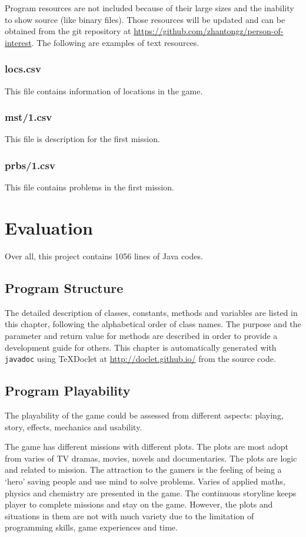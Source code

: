 \documentclass[letterpaper, 11pt]{report}
\begin{document}
Program resources are not included because of their large sizes and the inability to show source (like binary files). Those resources will be updated and can be obtained from the git repository at \url{https://github.com/zhantongz/person-of-interest}. The following are examples of text resources.
\section{locs.csv}
This file contains information of locations in the game.


\section{mst/1.csv}
This file is description for the first mission.


\section{prbs/1.csv}
This file contains problems in the first mission.

\part{Evaluation}
Over all, this project contains 1056 lines of Java codes.
\chapter{Program Structure}
The detailed description of classes, constants, methods and variables are listed in this chapter, following the alphabetical order of class names. The purpose and the parameter and return value for methods are described in order to provide a development guide for others. This chapter is automatically generated with \texttt{javadoc} using TeXDoclet at \url{http://doclet.github.io/} from the source code.

\chapter{Program Playability}
The playability of the game could be assessed from different aspects: playing, story, effects, mechanics and usability.

The game has different missions with different plots. The plots are most adopt from varies of TV dramas, movies, novels and documentaries. The plots are logic and related to mission. The attraction to the gamers is the feeling of being a `hero' saving people and use mind to solve problems. Varies of applied maths, physics and chemistry are presented in the game. The continuous storyline keeps player to complete missions and stay on the game. However, the plots and situations in them are not with much variety due to the limitation of programming skills, game experiences and time.
\end{document}
